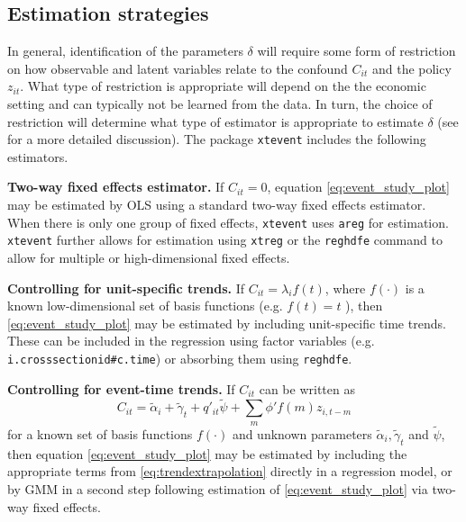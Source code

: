 \documentclass[bib]{./sty/statapress}
\begin{document}
\subsection{Estimation strategies}

In general, identification of the parameters $\delta$ will require some form of restriction on how observable and latent variables relate to the confound $C_{it}$ and the policy $z_{it}$.
What type of restriction is appropriate will depend on the the economic setting and can typically not be learned from the data.
In turn, the choice of restriction will determine what type of estimator is appropriate to estimate $\delta$ (see \citeauthor{freyaldenhoven2021visualization} \citeyear{freyaldenhoven2021visualization} for a more detailed discussion).
The package \texttt{xtevent} includes the following estimators.

\noindent \textbf{Two-way fixed effects estimator.}
If $C_{it} = 0$, equation \eqref{eq:event_study_plot} may be estimated by OLS using a standard two-way fixed effects estimator.
When there is only one group of fixed effects, \texttt{xtevent} uses \texttt{areg} for estimation.
\texttt{xtevent} further allows for estimation using \texttt{xtreg} or the \texttt{reghdfe} command \citep{guimaraes2010simple,Correia2017:HDFE,correia2019reghdfe} to allow for multiple or high-dimensional fixed effects.

\noindent \textbf{Controlling for unit-specific trends.}
If $C_{it} = \lambda_i f(t)$, where $f(\cdot)$ is a known low-dimensional set of basis functions (e.g. $f(t) = t$ ), then \eqref{eq:event_study_plot} may be estimated by including unit-specific time trends.
These can be included in the regression using factor variables (e.g. \texttt{i.crosssectionid\#c.time}) or absorbing them using \texttt{reghdfe}.

\noindent \textbf{Controlling for event-time trends.}
If $C_{it}$ can be written as
\begin{equation}\label{eq:trendextrapolation}
  C_{it} = \tilde{\alpha}_i + \tilde{\gamma}_t + q'_{it} \tilde{\psi} + \sum_{m} \phi' f(m) z_{i,t-m}
\end{equation}
for a known set of basis functions $f(\cdot)$ and unknown parameters $\tilde{\alpha}_i, \tilde{\gamma}_t$ and $\tilde{\psi}$, then equation \eqref{eq:event_study_plot} may be estimated by including the appropriate terms from \eqref{eq:trendextrapolation} directly in a regression model, or by GMM in a second step following estimation of \eqref{eq:event_study_plot}  via two-way fixed effects.
\end{document}
